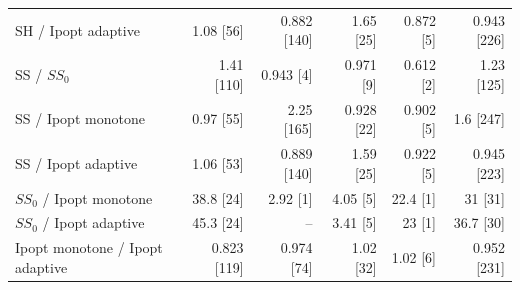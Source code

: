 \begin{tabular}{@{}lrrrrr@{}}
SH / Ipopt adaptive & 1.08 [56] & 0.882 [140] & 1.65 [25] & 0.872 [5] & 0.943 [226]\\
SS / $SS_0$ & 1.41 [110] & 0.943 [4] & 0.971 [9] & 0.612 [2] & 1.23 [125]\\
SS / Ipopt monotone & 0.97 [55] & 2.25 [165] & 0.928 [22] & 0.902 [5] & 1.6 [247]\\
SS / Ipopt adaptive & 1.06 [53] & 0.889 [140] & 1.59 [25] & 0.922 [5] & 0.945 [223]\\
$SS_0$ / Ipopt monotone & 38.8 [24] & 2.92 [1] & 4.05 [5] & 22.4 [1] & 31 [31]\\
$SS_0$ / Ipopt adaptive & 45.3 [24] & -- & 3.41 [5] & 23 [1] & 36.7 [30]\\
Ipopt monotone / Ipopt adaptive & 0.823 [119] & 0.974 [74] & 1.02 [32] & 1.02 [6] & 0.952 [231]\\
\bottomrule
\end{tabular}
